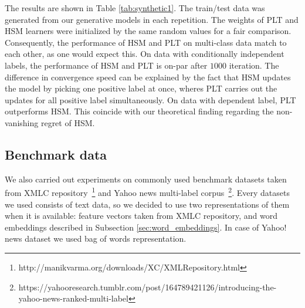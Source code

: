 \documentclass{article}
\newcommand{\Algo}[1]{\textsc{#1}}
\begin{document}
The results are shown in Table \ref{tab:synthetic1}. The train/test data was generated from our generative models in each repetition. The weights of \Algo{PLT} and \Algo{HSM} learners were initialized by the same random values for a fair comparison. Consequently, the performance of \Algo{HSM} and \Algo{PLT} on multi-class data match to each other, as one would expect this. On data with conditionally independent labels, the performance of \Algo{HSM} and \Algo{PLT} is on-par after $1000$ iteration. The difference in convergence speed can be explained by the fact that \Algo{HSM} updates the model by picking one positive label at once, wheres \Algo{PLT}  carries out the updates for all positive label simultaneously. On data with dependent label, \Algo{PLT} outperforms \Algo{HSM}. This coincide with our theoretical finding regarding the non-vanishing regret of \Algo{HSM}. 





\subsection{Benchmark data}

We also carried out experiments on commonly used benchmark datasets taken from XMLC repository~\footnote{http://manikvarma.org/downloads/XC/XMLRepository.html} and Yahoo news multi-label corpus~\footnote{https://yahooresearch.tumblr.com/post/164789421126/introducing-the-yahoo-news-ranked-multi-label}. Every datasets we used consists of text data, so we decided to use two representations of them when it is available: feature vectors taken from XMLC repository, and word embeddings described in Subsection \ref{sec:word_embeddings}. In case of Yahoo! news dataset we used bag of words representation.
\end{document}
